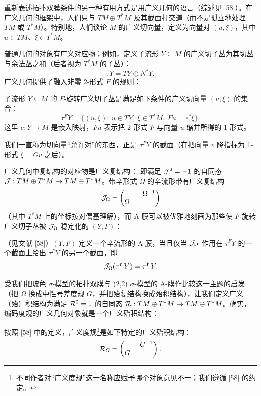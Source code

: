 重新表述拓扑双膜条件的另一种有用方式是用广义几何的语言（综述见 [58]）。在广义几何的框架中，人们只与 $TM\oplus T^*M$ 及其截面打交道（而不是孤立地处理 $TM$ 或 $T^*M$）。特别地，人们谈论 $M$ 的广义切向量，定义为向量对 $(u,\xi)$，其中 $u\in TM$、$\xi\in T^*M$。

普通几何的对象有广义对应物；例如，定义子流形 $Y\subseteq M$ 的广义切子丛为其切丛与余法丛之和（后者视为 $T^*M$ 的子丛）：
\[
\tau Y=TY\oplus N^*Y.
\]
广义几何提供了融入非零 2-形式 $F$ 的规则：

\begin{definition}[5]
子流形 $Y\subseteq M$ 的 $F$-旋转广义切子丛是满足如下条件的广义切向量 $(u,\xi)$ 的集合：
\[
\tau^FY=\{(u,\xi):\ u\in TY,\ \xi\in T^*M,\ Fu=e^*\xi\}.
\]
这里 $e:Y\to M$ 是嵌入映射，$Fu$ 表示把 2-形式 $F$ 与向量 $u$ 缩并所得的 1-形式。
\end{definition}

我们一直称为切向量“允许对”的东西，正是 $\tau^FY$ 的截面（在把向量 $v$ 降指标为 1-形式 $\xi=Gv$ 之后）。

广义几何中复结构的对应物是广义复结构：
即满足 $\mathcal{J}^2=-1$ 的自同态 $\mathcal{J}:TM\oplus T^*M\to TM\oplus T^*M$。带辛形式 $\Omega$ 的辛流形带有广义复结构
\[
\mathcal{J}_\Omega=\begin{pmatrix}&-\Omega^{-1}\\ \Omega&\end{pmatrix}
\]
（其中 $T^*M$ 上的坐标按对偶基理解），而 A-膜可以被优雅地刻画为那些使 $F$-旋转广义切子丛被 $\mathcal{J}_\Omega$ 稳定化的 $(Y,F)$：

\begin{proposition}[4]
（见文献 [58]）$(Y,F)$ 定义一个辛流形的 A-膜，当且仅当 $\mathcal{J}_\Omega$ 作用在 $\tau^FY$ 的一个截面上给出 $\tau^FY$ 的另一个截面，即
\[
\mathcal{J}_\Omega(\tau^FY)=\tau^FY.
\]
\end{proposition}

受我们把玻色 $\sigma$-模型的拓扑双膜与 (2,2) $\sigma$-模型的 A-膜作比较这一主题的启发（把 $\Omega$ 换成中性号差度规 $G$，并把殆复结构换成殆积结构），让我们定义广义（殆）积结构为满足 $\mathcal{R}^2=1$ 的自同态 $\mathcal{R}:TM\oplus T^*M\to TM\oplus T^*M$。确实，编码度规的广义几何对象就是一个广义殆积结构：

\begin{definition}[6]
按照 [58] 中的定义，广义度规\footnote{不同作者对“广义度规”这一名称应赋予哪个对象意见不一；我们遵循 [58] 的约定。}是如下特定的广义殆积结构：
\[
\mathcal{R}_G=\begin{pmatrix}&\ G^{-1}\\ G&\end{pmatrix}.
\]
\end{definition}

